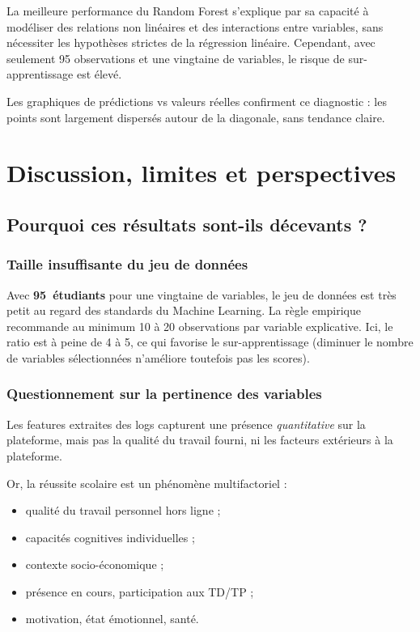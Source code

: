 \documentclass[12pt, a4paper, french]{report}
\begin{document}
La meilleure performance du Random Forest s'explique par sa capacité à modéliser des relations non linéaires et des interactions entre variables, sans nécessiter les hypothèses strictes de la régression linéaire.
Cependant, avec seulement 95 observations et une vingtaine de variables, le risque de sur-apprentissage est élevé.

Les graphiques de prédictions vs valeurs réelles confirment ce diagnostic : les points sont largement dispersés autour de la diagonale, sans tendance claire.

\chapter{Discussion, limites et perspectives}

\section{Pourquoi ces résultats sont-ils décevants ?}

\subsection{Taille insuffisante du jeu de données}

Avec \textbf{95~étudiants} pour une vingtaine de variables,
le jeu de données est très petit au regard des standards du Machine Learning. La règle empirique recommande au minimum 10 à 20 observations par variable explicative. Ici, le ratio est à peine de 4 à 5, ce qui favorise le sur-apprentissage (diminuer le nombre de variables sélectionnées n'améliore toutefois pas les scores).

\subsection{Questionnement sur la pertinence des variables}

Les features extraites des logs capturent une présence \textit{quantitative} sur la plateforme, mais pas la qualité du travail fourni, ni les facteurs extérieurs à la plateforme.

\vspace{0.3cm}
\noindent Or, la réussite scolaire est un phénomène multifactoriel :
\begin{itemize}
  \item qualité du travail personnel hors ligne ;
  \item capacités cognitives individuelles ;
  \item contexte socio-économique ;
  \item présence en cours, participation aux TD/TP ;
  \item motivation, état émotionnel, santé.
\end{itemize}
\end{document}

